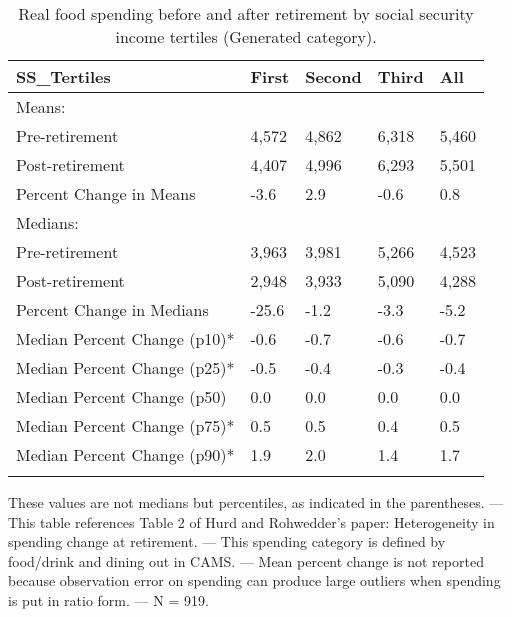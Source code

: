 \begin{table}[tbp] \centering
{}

\caption{Real food spending before and after retirement by social security income tertiles (Generated category).}
\begin{tabularx}{\textwidth}{lCCCC}

\toprule
{SS\_Tertiles}&{First}&{Second}&{Third}&{All} \tabularnewline
\midrule\addlinespace[1.5ex]
Means:&&&& \tabularnewline
\midrule Pre-retirement&4,572&4,862&6,318&5,460 \tabularnewline
Post-retirement&4,407&4,996&6,293&5,501 \tabularnewline
Percent Change in Means&-3.6&2.9&-0.6&0.8 \tabularnewline
\midrule Medians:&&&& \tabularnewline
\midrule Pre-retirement&3,963&3,981&5,266&4,523 \tabularnewline
Post-retirement&2,948&3,933&5,090&4,288 \tabularnewline
Percent Change in Medians&-25.6&-1.2&-3.3&-5.2 \tabularnewline
Median Percent Change (p10)*&-0.6&-0.7&-0.6&-0.7 \tabularnewline
Median Percent Change (p25)*&-0.5&-0.4&-0.3&-0.4 \tabularnewline
Median Percent Change (p50)&0.0&0.0&0.0&0.0 \tabularnewline
Median Percent Change (p75)*&0.5&0.5&0.4&0.5 \tabularnewline
Median Percent Change (p90)*&1.9&2.0&1.4&1.7 \tabularnewline
\bottomrule \addlinespace[1.5ex]

\end{tabularx}
\begin{flushleft}
\footnotesize *These values are not medians but percentiles, as indicated in the parentheses. \linebreak --- \linebreak This table references Table 2 of Hurd and Rohwedder's paper: Heterogeneity in spending change at retirement. \linebreak --- \linebreak This spending category is defined by food/drink and dining out in CAMS. \linebreak --- \linebreak Mean percent change is not reported because observation error on spending can produce large outliers when spending is put in ratio form. \linebreak --- \linebreak N = 919.
\end{flushleft}
\end{table}
